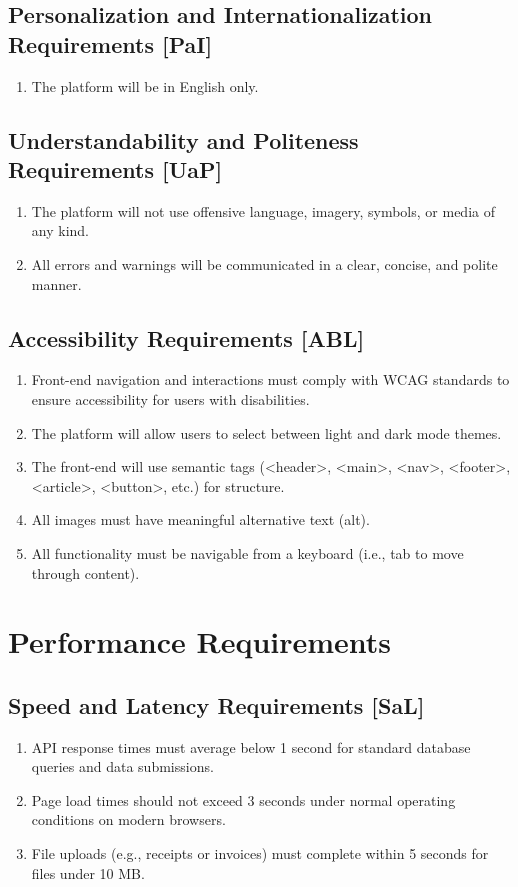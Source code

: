 \documentclass[12pt]{article}
\begin{document}
  \subsection{Personalization and Internationalization Requirements [PaI]}
    \begin{enumerate}
      \item The platform will be in English only.
    \end{enumerate}

  \subsection{Understandability and Politeness Requirements [UaP]}
    \begin{enumerate}
      \item The platform will not use offensive language, imagery, symbols, or media of any kind.
      \item All errors and warnings will be communicated in a clear, concise, and polite manner.
    \end{enumerate}

  \subsection{Accessibility Requirements [ABL]}
    \begin{enumerate}
      \item Front-end navigation and interactions must comply with WCAG standards to ensure accessibility for users with disabilities.
      \item The platform will allow users to select between light and dark mode themes.
      \item The front-end will use semantic tags (<header>, <main>, <nav>, <footer>, <article>, <button>, etc.) for structure.
      \item All images must have meaningful alternative text (alt).
      \item All functionality must be navigable from a keyboard (i.e., tab to move through content).
    \end{enumerate}

\section{Performance Requirements}
  \subsection{Speed and Latency Requirements [SaL]}
    \begin{enumerate}
        \item API response times must average below 1 second for standard database queries and data submissions.
        \item Page load times should not exceed 3 seconds under normal operating conditions on modern browsers.
        \item File uploads (e.g., receipts or invoices) must complete within 5 seconds for files under 10 MB.
    \end{enumerate}
\end{document}
